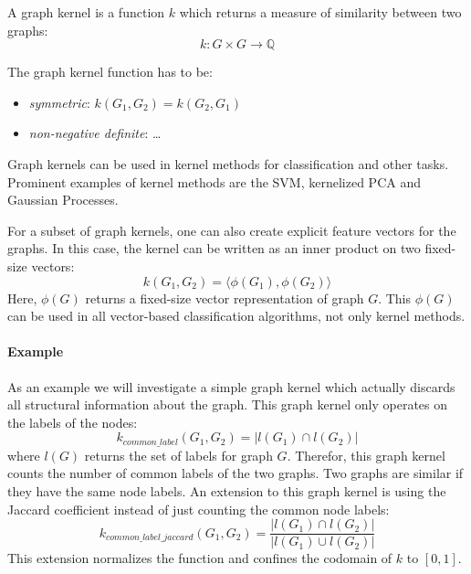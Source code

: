 A graph kernel is a function $k$ which returns a measure of similarity between two graphs:
\begin{equation*}
k: G \times G \rightarrow \mathbb{Q}
\end{equation*}

The graph kernel function has to be:
\begin{itemize}
    \item{\textit{symmetric}: $k(G_1, G_2) = k(G_2, G_1)$}
    \item{\textit{non-negative definite}: \dots}
\end{itemize}

Graph kernels can be used in kernel methods for classification and other tasks.
Prominent examples of kernel methods are the SVM, kernelized PCA and Gaussian Processes.

For a subset of graph kernels, one can also create explicit feature vectors for the graphs. In this case, the kernel can be written as an inner product on two fixed-size vectors:
\begin{equation*}
    k(G_1, G_2) = \langle \phi(G_1), \phi(G_2) \rangle
\end{equation*}
Here, $\phi(G)$ returns a fixed-size vector representation of graph $G$.
This $\phi(G)$ can be used in all vector-based classification algorithms, not only kernel methods.

\paragraph{Example}
As an example we will investigate a simple graph kernel which actually discards all structural information about the graph. This graph kernel only operates on the labels of the nodes:
\begin{equation*}
k_{common\_label}(G_1, G_2) = | l(G_1) \cap l(G_2) |
\end{equation*}
where $l(G)$ returns the set of labels for graph $G$.
Therefor, this graph kernel counts the number of common labels of the two graphs. Two graphs are similar if they have the same node labels.
An extension to this graph kernel is using the Jaccard coefficient instead of just counting the common node labels:
\begin{equation*}
k_{common\_label\_jaccard}(G_1, G_2) = \frac{| l(G_1) \cap l(G_2) |}{| l(G_1) \cup l(G_2) |}
\end{equation*}
This extension normalizes the function and confines the codomain of $k$ to $[0, 1]$.

